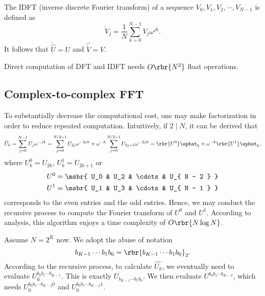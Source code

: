 \documentclass[english, nochinese]{pnote}
\begin{document}
The IDFT (inverse discrete Fourier transform) of a sequence $ V_0, V_1, V_2, \cdots, V_{ N - 1 } $ is defined as
\begin{equation}
\check{V}_j = \frac{1}{N} \sum_{ k = 0 }^{ N - 1 } V_j \omega^{ j k }.
\end{equation}
It follows that $ \check{\hat{U}} = U $ and $ \hat{\check{V}} = V $.

Direct computation of DFT and IDFT needs $ O \rbr{N^2} $ float operations.

\subsection{Complex-to-complex FFT}

To substantially decrease the computational cost, one may make factorization in order to reduce repeated computation. Intuitively, if $ 2 \mid N $, it can be derived that
\begin{equation}
\hat{U}_k = \sum_{ j = 0 }^{ N - 1 } U_j \omega^{ -j k } = \sum_{ j = 0 }^{ N / 2 - 1 } U_{ 2 j } \omega^{ -2 j k } + \omega^{-k} \sum_{ j = 0 }^{ N / 2 - 1 } U_{ 2 j + 1 } \omega^{ -2 j k } = \rbr{U^0}\sphat_k + \omega^{-k} \rbr{U^1}\sphat_k,
\end{equation}
where $ U^0_k = U_{ 2 k } $, $ U^1_k = U_{ 2 k + 1 } $ or
\begin{gather}
U^0 = \msbr{ U_0 & U_2 & \cdots & U_{ N - 2 } } \\
U^1 = \msbr{ U_1 & U_3 & \cdots & U_{ N - 1 } }
\end{gather}
corresponds to the even entries and the odd entries. Hence, we may conduct the recursive process to compute the Fourier transform of $U^0$ and $U^1$. According to analysis, this algorithm enjoys a time complexity of $ O \rbr{ N \log N } $.

Assume $ N = 2^K $ now.
We adopt the abuse of notation
\begin{equation}
b_{ K - 1 } \cdots b_1 b_0 = \rbr{ b_{ K - 1 } \cdots b_1 b_0 }_2.
\end{equation}
According to the recursive process, to calculate $\hat{U_k}$, we eventually need to evaluate $ U^{ b_0 b_1 \cdots b_{ K - 1 } }_0 $. This is exactly $ U_{ b_{ K - 1 } \cdots b_1 b_0 } $. We then evaluate $ U^{ b_0 b_1 \cdots b_{ K - 2 } } $, which needs $ U^{ b_0 b_1 \cdots b_{ K - 2 } 0 }_0 $ and $ U^{ b_0 b_1 \cdots b_{ K - 2 } 1 }_0 $.
\end{document}
